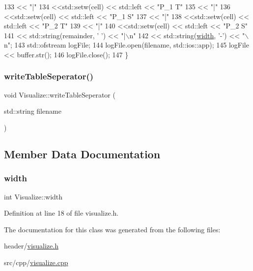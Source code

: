 \begin{DoxyCode}
133            << \textcolor{stringliteral}{"|"}
134            <<std::setw(cell) << std::left << \textcolor{stringliteral}{"P\_1 T"}
135            << \textcolor{stringliteral}{"|"}
136            <<std::setw(cell) << std::left << \textcolor{stringliteral}{"P\_1 S"}
137            << \textcolor{stringliteral}{"|"}
138            <<std::setw(cell) << std::left << \textcolor{stringliteral}{"P\_2 T"}
139            << \textcolor{stringliteral}{"|"}
140            <<std::setw(cell) << std::left << \textcolor{stringliteral}{"P\_2 S"}
141            << std::string(remainder, \textcolor{charliteral}{' '}) << \textcolor{stringliteral}{"|\(\backslash\)n"}
142            << std::string(\hyperlink{class_visualize_af5ac723ad5f8fe8c4a8378bf1299cda7}{width}, \textcolor{charliteral}{'-'}) << \textcolor{stringliteral}{"\(\backslash\)n"};
143     std::ofstream logFile;
144     logFile.open(filename, std::ios::app);
145     logFile << buffer.str();
146     logFile.close();
147 \}
\end{DoxyCode}
\mbox{\label{class_visualize_ac5530b8e917c748163e621cf5677eeb5}} 
\subsubsection{\texorpdfstring{write\+Table\+Seperator()}{writeTableSeperator()}}
{\footnotesize\ttfamily void Visualize\+::write\+Table\+Seperator (\begin{DoxyParamCaption}\item[{std\+::string}]{filename }\end{DoxyParamCaption})}



\subsection{Member Data Documentation}
\mbox{\label{class_visualize_af5ac723ad5f8fe8c4a8378bf1299cda7}} 
\subsubsection{\texorpdfstring{width}{width}}
{\footnotesize\ttfamily int Visualize\+::width}



Definition at line 18 of file visualize.\+h.



The documentation for this class was generated from the following files\+:\begin{DoxyCompactItemize}
\item 
header/\hyperlink{visualize_8h}{visualize.\+h}\item 
src/cpp/\hyperlink{visualize_8cpp}{visualize.\+cpp}\end{DoxyCompactItemize}
